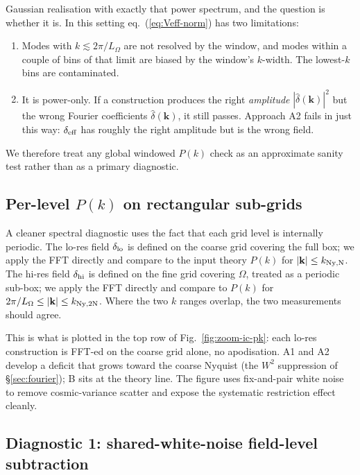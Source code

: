 \documentclass[12pt]{article}
\begin{document}
Gaussian realisation with exactly that power spectrum, and the
question is whether it is. In this setting eq.~(\ref{eq:Veff-norm})
has two limitations:
\begin{enumerate}
\item Modes with $k\lesssim 2\pi/L_\Omega$ are not resolved by the
      window, and modes within a couple of bins of that limit are
      biased by the window's $k$-width. The lowest-$k$ bins are
      contaminated.
\item It is power-only. If a construction produces the right
      \emph{amplitude} $|\hat\delta(\mathbf k)|^2$ but the wrong
      Fourier coefficients $\hat\delta(\mathbf k)$, it still passes.
      Approach A2 fails in just this way: $\delta_{\rm eff}$ has
      roughly the right amplitude but is the wrong field.
\end{enumerate}
We therefore treat any global windowed $P(k)$ check as an approximate
sanity test rather than as a primary diagnostic.

\subsection{Per-level $P(k)$ on rectangular sub-grids}\label{sec:val-perlevel}

A cleaner spectral diagnostic uses the fact that each grid level is
internally periodic. The lo-res field $\delta_{\rm lo}$ is defined on
the coarse grid covering the full box; we apply the FFT directly and
compare to the input theory $P(k)$ for $|\mathbf k|\le k_{\rm Ny,N}$.
The hi-res field $\delta_{\rm hi}$ is defined on the fine grid covering
$\Omega$, treated as a periodic sub-box; we apply the FFT directly and
compare to $P(k)$ for $2\pi/L_\Omega\le|\mathbf k|\le k_{\rm Ny,2N}$.
Where the two $k$ ranges overlap, the two measurements should agree.

This is what is plotted in the top row of Fig.~\ref{fig:zoom-ic-pk}:
each lo-res construction is FFT-ed on the coarse grid alone, no
apodisation. A1 and A2 develop a deficit that grows toward the coarse
Nyquist (the $W^2$ suppression of \S\ref{sec:fourier}); B sits at the
theory line. The figure uses fix-and-pair white noise to remove
cosmic-variance scatter and expose the systematic restriction effect
cleanly.

\subsection{Diagnostic 1: shared-white-noise field-level subtraction}\label{sec:val-fieldsub}
\end{document}
